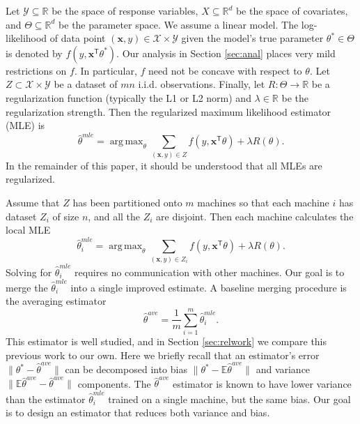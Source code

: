 \documentclass[twoside]{article}
\DeclareMathOperator*{\argmax}{arg\,max}
\newcommand{\Y}{\mathcal{Y}}
\newcommand{\X}{\mathcal{X}}
\newcommand{\E}{\mathbb{E}}
\newcommand{\x}{\mathbf{x}}
\newcommand{\w}{\theta}
\newcommand{\wave}{\hat\w^{ave}}
\newcommand{\wmle}{\hat\w^{mle}}
\newcommand{\wstar}{{\w^{*}}}
\newcommand{\trans}[1]{\ensuremath{{#1}^{\mathsf{T}}}}
\newcommand{\ltwo}[1]{{\lVert {#1} \rVert}}
\begin{document}
Let $\Y\subseteq\mathbb{R}$ be the space of response variables,
$X\subseteq\mathbb{R}^d$ be the space of covariates,
and $\Theta\subseteq\mathbb{R}^d$ be the parameter space.
We assume a linear model.
The log-likelihood of data point $(\x,y)\in\X\times\Y$ given the model's true parameter $\wstar\in\Theta$ is denoted by $f(y,\trans\x\wstar)$.
Our analysis in Section \ref{sec:anal} places very mild restrictions on $f$.
In particular, $f$ need not be concave with respect to $\w$.
Let $Z\subset\X\times\Y$ be a dataset of $mn$ i.i.d. observations.
Finally, let $R : \Theta \to \mathbb{R}$ be a regularization function (typically the L1 or L2 norm)
and $\lambda\in\mathbb{R}$ be the regularization strength.
Then the regularized maximum likelihood estimator (MLE) is
\begin{equation}
\wmle=\argmax_\w \sum_{(\x,y)\in Z} f(y,\trans\x\w)
+ \lambda R(\theta)
.
\end{equation}
In the remainder of this paper, it should be understood that all MLEs are regularized.

Assume that $Z$ has been partitioned onto $m$ machines so that each machine $i$ has dataset $Z_i$ of size $n$, and all the $Z_i$ are disjoint.
Then each machine calculates the local MLE
\begin{equation}
\wmle_i = \argmax_\w \sum_{(\x,y) \in Z_i} f(y,\trans\x\w)
+ \lambda R(\theta)
.
\end{equation}
Solving for $\wmle_i$ requires no communication with other machines.
Our goal is to merge the $\wmle_i$ into a single improved estimate.
A baseline merging procedure is the averaging estimator
\begin{equation}
\wave = \frac{1}{m}\sum_{i=1}^m \wmle_i
.
\end{equation}
This estimator is well studied, and in Section \ref{sec:relwork} we compare this previous work to our own.
Here we briefly recall that an estimator's error $\ltwo{\wstar-\wave}$ can be decomposed into bias $\ltwo{\wstar - \E\wave}$ and variance $\ltwo{\E\wave-\wave}$ components.
The $\wave$ estimator is known to have lower variance than the estimator $\wmle_i$ trained on a single machine, but the same bias.
Our goal is to design an estimator that reduces both variance and bias.
\end{document}
